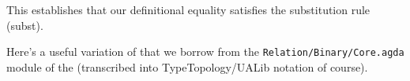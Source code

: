 \ccpad
This establishes that our definitional equality satisfies the substitution rule (subst).

Here's a useful variation of  that we borrow from the \texttt{Relation/Binary/Core.agda} module of the \agdastdlib (transcribed into TypeTopology/UALib notation of course).
\ccpad
\begin{code}%
\>[0]\AgdaSpace{}%
\AgdaSymbol{:}%
\>[101I]\AgdaSymbol{\{}\AgdaSpace{}%
\AgdaSymbol{:}\AgdaSpace{}%
\AgdaSpace{}%
\AgdaSymbol{\}\{}\AgdaSpace{}%
\AgdaSymbol{:}\AgdaSpace{}%
\AgdaSpace{}%
\AgdaSpace{}%
\AgdaSpace{}%
\AgdaSymbol{\}\{}\AgdaSpace{}%
\AgdaSpace{}%
\AgdaSymbol{:}\AgdaSpace{}%
\AgdaSpace{}%
\AgdaSymbol{\}}\AgdaSpace{}%
\AgdaSpace{}%
\AgdaSpace{}%
\AgdaSpace{}%
\AgdaSpace{}%
\AgdaSpace{}%
\AgdaSymbol{(}\AgdaSpace{}%
\AgdaSymbol{:}\AgdaSpace{}%
\AgdaSymbol{)}\AgdaSpace{}%
\AgdaSpace{}%
\AgdaSpace{}%
\AgdaSpace{}%
\AgdaSpace{}%
\AgdaSpace{}%
\<%
\\
%
\>[0]\AgdaSpace{}%
\AgdaSpace{}%
\AgdaSymbol{\AgdaUnderscore{}}\AgdaSpace{}%
\AgdaSymbol{=}\AgdaSpace{}%
\<%
\end{code}


